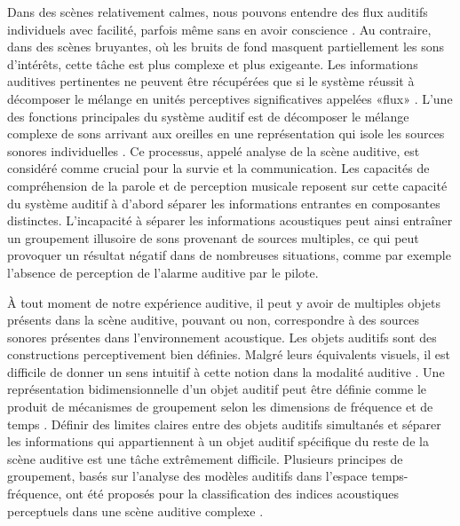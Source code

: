 Dans des scènes relativement calmes, nous pouvons entendre des flux auditifs individuels avec facilité, parfois même sans en avoir conscience \citep{sussman2007role}. 
Au contraire, dans des scènes bruyantes, où les bruits de fond masquent partiellement les sons d'intérêts, cette tâche est plus complexe et plus exigeante. 
Les informations auditives pertinentes ne peuvent être récupérées que si le système réussit à décomposer le mélange en unités perceptives significatives appelées «flux» \citep{bregman1990auditory}. 
L'une des fonctions principales du système auditif est de décomposer le mélange complexe de sons arrivant aux oreilles en une représentation qui isole les sources sonores individuelles \citep{dykstra2011neural}. 
Ce processus, appelé analyse de la scène auditive, est considéré comme crucial pour la survie et la communication. 
Les capacités de compréhension de la parole et de perception musicale reposent sur cette capacité du système auditif à d'abord séparer les informations entrantes en composantes distinctes. 
L'incapacité à séparer les informations acoustiques peut ainsi entraîner un groupement illusoire de sons provenant de sources multiples, ce qui peut provoquer un résultat négatif dans de nombreuses situations, comme par exemple l'absence de perception de l'alarme auditive par le pilote. 

À tout moment de notre expérience auditive, il peut y avoir de multiples objets présents dans la scène auditive, pouvant ou non, correspondre à des sources sonores présentes dans l'environnement acoustique. 
Les objets auditifs sont des constructions perceptivement bien définies. 
Malgré leurs équivalents visuels, il est difficile de donner un sens intuitif à cette notion dans la modalité auditive \citep{ahveninen2006task, alain2000selectively, dyson2010auditory, kubovy2001auditory, schnupp2013neural}. 
Une représentation bidimensionnelle d'un objet auditif peut être définie comme le produit de mécanismes de groupement selon les dimensions de fréquence et de temps \citep{bizley2013and, griffiths2004auditory, griffiths2012auditory}. 
Définir des limites claires entre des objets auditifs simultanés et séparer les informations qui appartiennent à un objet auditif spécifique du reste de la scène auditive est une tâche extrêmement difficile. 
Plusieurs principes de groupement, basés sur l'analyse des modèles auditifs dans l'espace temps-fréquence, ont été proposés pour la classification des indices acoustiques perceptuels dans une scène auditive complexe \citep{bizley2013and, griffiths2004auditory}.  

